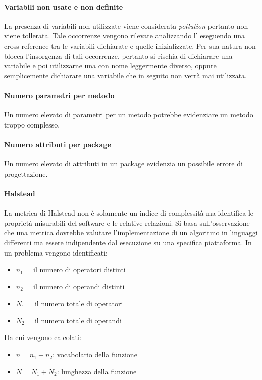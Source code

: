 			
			\paragraph{Variabili non usate e non definite}
			La presenza di variabili non utilizzate viene considerata \emph{pollution} pertanto non viene tollerata. Tale occorrenze vengono rilevate analizzando l' eseguendo una cross-reference tra le variabili dichiarate e quelle inizializzate. Per sua natura  non blocca l'insorgenza di tali occorrenze, pertanto si rischia  di dichiarare una variabile e poi utilizzarne una con nome leggermente diverso, oppure semplicemente dichiarare una variabile che in seguito non verrà mai utilizzata.

			
			\paragraph{Numero parametri per metodo}
			Un numero elevato di parametri per un metodo potrebbe evidenziare un metodo troppo complesso.

			
			\paragraph{Numero attributi per package}
			Un numero elevato di attributi in un package evidenzia un possibile errore di progettazione.

			
			\paragraph{Halstead}
			La metrica di Halstead non è solamente un indice di complessità ma identifica le proprietà misurabili del software e le relative relazioni.
			Si basa sull'osservazione che una metrica dovrebbe valutare l'implementazione di un algoritmo in linguaggi differenti ma essere indipendente dal esecuzione su una specifica piattaforma.
			In un problema vengono identificati:
			\begin{itemize}
				\item $n_1$ = il numero di operatori distinti
				\item $n_2$ = il numero di operandi distinti
				\item $N_1$ = il numero totale di operatori
				\item $N_2$ = il numero totale di operandi
			\end{itemize}
			Da cui vengono calcolati:
				\begin{itemize}
				\item $n = n_1 + n_2$: vocabolario della funzione
				\item $N = N_1 + N_2$: lunghezza della funzione
			\end{itemize}
			
